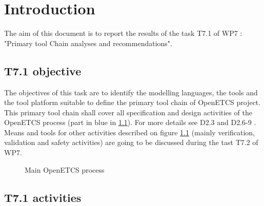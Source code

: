 

\chapter{Introduction}
\label{sec:intro}


The aim of this document is to report the results of the task T7.1 of WP7 :  "Primary tool Chain analyses and recommendations".


\section{T7.1 objective}

The objectives of this task are to identify the modelling languages, the tools and the tool platform suitable to define the primary tool chain of OpenETCS project. This primary tool chain shall  cover all specification and design activities of the OpenETCS process (part in blue in \ref{fig:main_process}). For more details see D2.3 \citep{D2_3} and D2.6-9 \citep{D2_6}. Means and tools for other activities described on figure \ref{fig:main_process} (mainly verification, validation and safety activities)  are going to be discussed during the tast T7.2 of WP7.


 \begin{figure}
  \centering
  \caption{Main OpenETCS process}
  \label{fig:main_process}
\end{figure}

\section{T7.1 activities}

